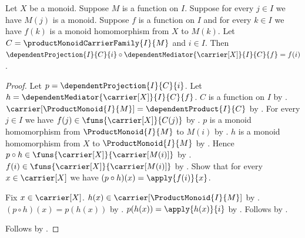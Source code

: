 \begin{theorem}\label{product_monoid_mediator_factorization}
    Let $X$ be a monoid.
    Suppose $M$ is a function on $I$.
    Suppose for every $j\in I$ we have $M(j)$ is a monoid.
    Suppose $f$ is a function on $I$ and for every $k\in I$ we have
        $f(k)$ is a monoid homomorphism from $X$ to $M(k)$.
    Let $C=\productMonoidCarrierFamily{I}{M}$ and $i\in I$.
    Then
        $\dependentProjection{I}{C}{i}\circ
            \dependentMediator{\carrier[X]}{I}{C}{f}=f(i)$.
\end{theorem}
\begin{proof}
    Let $p=\dependentProjection{I}{C}{i}$.
    Let $h=\dependentMediator{\carrier[X]}{I}{C}{f}$.
    $C$ is a function on $I$ by
        .
    $\carrier[\ProductMonoid{I}{M}]=\dependentProduct{I}{C}$ by
        .
    For every $j\in I$ we have
        $f(j)\in\funs{\carrier[X]}{C(j)}$ by
        .
    $p$ is a monoid homomorphism from $\ProductMonoid{I}{M}$ to
        $M(i)$ by .
    $h$ is a monoid homomorphism from $X$ to
        $\ProductMonoid{I}{M}$ by
        .
    Hence $p\circ h\in\funs{\carrier[X]}{\carrier[M(i)]}$ by
        .
    $f(i)\in\funs{\carrier[X]}{\carrier[M(i)]}$ by
        .
    Show that for every $x\in\carrier[X]$ we have
        $(p\circ h)(x)=\apply{f(i)}{x}$.
    \begin{subproof}
        Fix $x\in\carrier[X]$.
        $h(x)\in\carrier[\ProductMonoid{I}{M}]$ by
            .
        $(p\circ h)(x)=p(h(x))$ by
            .
        $p(h(x))=\apply{h(x)}{i}$ by
            .
        Follows by .
    \end{subproof}
    Follows by .
\end{proof}

